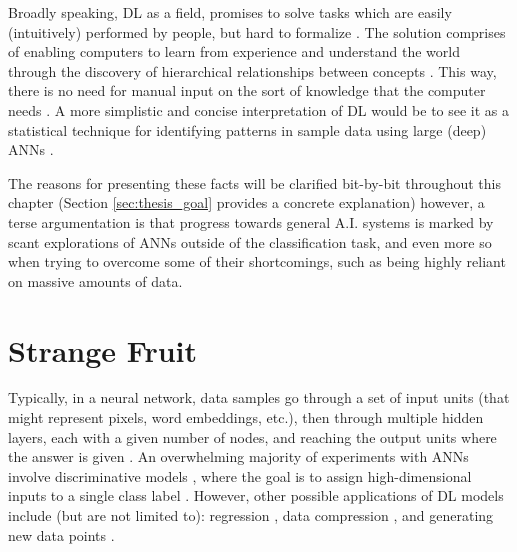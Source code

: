 \documentclass[a4paper]{book}
\begin{document}
Broadly speaking, DL as a field, promises to solve tasks which are easily (intuitively) performed by people, but hard to formalize \parencite[e.g., recognizing faces or spoken word;][]{goodfellow_deep_2016}. The solution comprises of enabling computers to learn from experience and understand the world through the discovery of hierarchical relationships between concepts \parencite{lecun_deep_2015}. This way, there is no need for manual input on the sort of knowledge that the computer needs \parencite{goodfellow_deep_2016}. A more simplistic and concise interpretation of DL would be to see it as a statistical technique for identifying patterns in sample data using large (deep) ANNs \parencite{marcus_deep_2018}.

The reasons for presenting these facts will be clarified bit-by-bit throughout this chapter (Section \ref{sec:thesis_goal} provides a concrete explanation) however, a terse argumentation is that progress towards general A.I. systems is marked by scant explorations of ANNs outside of the classification task, and even more so when trying to overcome some of their shortcomings, such as being highly reliant on massive amounts of data.

\section{Strange Fruit}\label{sec:no_disc}

Typically, in a neural network, data samples go through a set of input units (that might represent pixels, word embeddings, etc.), then through multiple hidden layers, each with a given number of nodes, and reaching the output units where the answer is given \parencite{marcus_deep_2018}. An overwhelming majority of experiments with ANNs involve discriminative models \parencite{goodfellow_generative_2014}, where the goal is to assign high-dimensional inputs to a single class label \parencite[such as an animal or piece of furniture;][]{zhang_character-level_2015, krizhevsky_imagenet_2012}. However, other possible applications of DL models include (but are not limited to): regression \parencite{qiu_ensemble_2014}, data compression \parencite{cheng_deep_2018}, and generating new data points \parencite{graves_generating_2013}.
\end{document}

